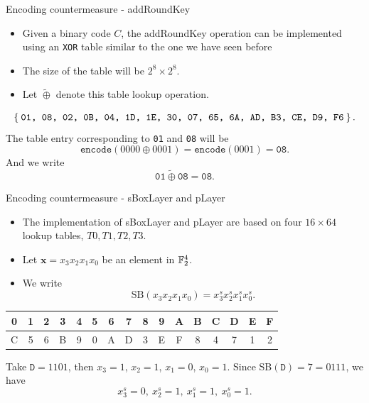 \begin{frame}{Encoding countermeasure - addRoundKey}
    \begin{itemize}
        \item Given a binary code $C$, the addRoundKey operation can be implemented using an \texttt{XOR} table similar to the one we have seen before
        \item The size of the table will be $2^8\times2^8$.
        \item Let $\widetilde{\oplus}$ denote this table lookup operation.
    \end{itemize}
\begin{example}
\begin{equation*}
    \Set{\texttt{01, 08, 02, 0B, 04, 1D, 1E, 30, 07, 65, 6A, AD, B3, CE, D9, F6}}.
\end{equation*}
The table entry corresponding to \texttt{01} and \texttt{08} will be
    \[
    \texttt{encode}(0000\oplus0001)=\texttt{encode}(0001)=\texttt{08}.
    \]
And we write
    \[
    \texttt{01}\widetilde{\oplus}\texttt{08}=\texttt{08}.
    \]
\end{example}
\end{frame}

\begin{frame}{Encoding countermeasure - sBoxLayer and pLayer}
\begin{itemize}
    \item The implementation of sBoxLayer and pLayer are based on four $16\times 64$ lookup tables, $T0, T1, T2,T3$.
    \item Let $\boldsymbol{x}=x_3x_2x_1x_0$ be an element in ${\mathbb F}_2^4$.
    \item We write 
\[
\text{SB}(x_3x_2x_1x_0)=x^s_3x^s_2x^s_1x^s_0.
\]
\end{itemize}
\begin{table}[htb]
\centering
\ttfamily
\begin{tabular}{cccccccccccccccc}\hline
 0 & 1 & 2 & 3 & 4 & 5 & 6 & 7 & 8 & 9 & A & B & C & D & E & F \\\hline
 C & 5 & 6 & B & 9 & 0 & A & D & 3 & E & F & 8 & 4 & 7 & 1 & 2\\\hline
\end{tabular}
\end{table}
\begin{example}
    Take $\texttt{D}=1101$, then $x_3=1$, $x_2=1$, $x_1=0$, $x_0=1$.
    Since SB$(\texttt{D})=7=0111$, we have
    \[
    x_3^s=0,\ x_2^s=1,\ x_1^s=1,\ x_0^s=1.
    \]
\end{example}
\end{frame}


